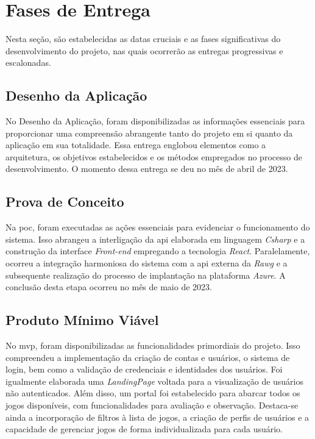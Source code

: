\clearpage
\section{Fases de Entrega}

Nesta seção, são estabelecidas as datas cruciais e as fases significativas do desenvolvimento do projeto, nas quais ocorrerão as entregas progressivas e escalonadas.

\subsection{Desenho da Aplicação}

No Desenho da Aplicação, foram disponibilizadas as informações essenciais para proporcionar uma compreensão abrangente tanto do projeto em si quanto da aplicação em sua totalidade. Essa entrega englobou elementos como a arquitetura, os objetivos estabelecidos e os métodos empregados no processo de desenvolvimento. O momento dessa entrega se deu no mês de abril de 2023.

\subsection{Prova de Conceito}

Na \ac{poc}, foram executadas as ações essenciais para evidenciar o funcionamento do sistema. Isso abrangeu a interligação da \ac{api} elaborada em linguagem \textit{\gls{Csharp}} e a construção da interface \textit{\gls{Front-end}} empregando a tecnologia \textit{\gls{React}}. Paralelamente, ocorreu a integração harmoniosa do sistema com a \ac{api} externa da \textit{\gls{Rawg}} e a subsequente realização do processo de implantação na plataforma \textit{\gls{Azure}}. A conclusão desta etapa ocorreu no mês de maio de 2023.

\subsection{Produto Mínimo Viável}

No \ac{mvp}, foram disponibilizadas as funcionalidades primordiais do projeto. Isso compreendeu a implementação da criação de contas e usuários, o sistema de login, bem como a validação de credenciais e identidades dos usuários. Foi igualmente elaborada uma \textit{\gls{LandingPage}} voltada para a visualização de usuários não autenticados. Além disso, um portal foi estabelecido para abarcar todos os jogos disponíveis, com funcionalidades para avaliação e observação. Destaca-se ainda a incorporação de filtros à lista de jogos, a criação de perfis de usuários e a capacidade de gerenciar jogos de forma individualizada para cada usuário. 

